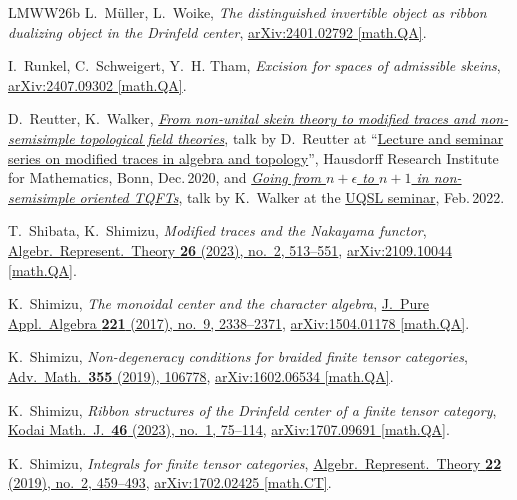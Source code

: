 \documentclass[11pt]{amsart}
\theoremstyle{definition}
\numberwithin{equation}{section}
\newcommand\arxiv[2]      {\href{http://arXiv.org/abs/#1}{arXiv:#2}}
\newcommand\doi[2]        {\href{http://dx.doi.org/#1}{#2}}
\begin{document}
\begin{thebibliography}{LMWW26b}
L.~M\"uller, L.~Woike,
\textsl{The distinguished invertible object as ribbon dualizing object in the Drinfeld center},
\arxiv{2401.02792}{2401.02792 [math.QA]}.

I.~Runkel, C.~Schweigert, Y.~H. Tham,
\textsl{Excision for spaces of admissible skeins},
\arxiv{2407.09302}{2407.09302 [math.QA]}.

D.~Reutter, K.~Walker, \href{https://www.davidreutter.com/#h.p_e6SqJNffk9Sy}{\emph{From non-unital skein theory to modified traces and non-semisimple topological field theories}}, talk by D.~Reutter at ``\href{https://him-application.uni-bonn.de/en/programs/past-programs/past-junior-trimester-programs/new-trends-in-representation-theory/lecture-and-seminar-series-on-modified-traces-in-algebra-and-topology}{Lecture and seminar series on modified traces in algebra and topology}'', Hausdorff Research Institute for Mathematics, Bonn, Dec.\,2020, and \href{https://canyoN_23.net/math/talks}{\emph{Going from $n+\epsilon$ to $n+1$ in non-semisimple oriented TQFTs}}, talk by K.~Walker at the \href{https://www.coreyjonesmath.com/uqsl-fall2020}{UQSL seminar}, Feb.\,2022.

T.~Shibata, K.~Shimizu,
\textsl{Modified traces and the Nakayama functor},
\doi{10.1007/s10468-021-10102-5}{Algebr.\ Represent.\ Theory \textbf{26} (2023), no.~2, 513--551},
\arxiv{2109.10044}{2109.10044 [math.QA]}.

K.~Shimizu,
\textsl{The monoidal center and the character algebra},
\doi{10.1016/j.jpaa.2016.12.037}{J.\ Pure Appl.\ Algebra \textbf{221} (2017), no.~9, 2338--2371},
\arxiv{1504.01178}{1504.01178 [math.QA]}.

K.~Shimizu,
\textsl{Non-degeneracy conditions for braided finite tensor categories},
\doi{10.1016/j.aim.2019.106778}{Adv.\ Math.\ \textbf{355} (2019), 106778},
\arxiv{1602.06534}{1602.06534 [math.QA]}.

K.~Shimizu,
\textsl{Ribbon structures of the Drinfeld center of a finite tensor category},
\doi{10.2996/kmj46106}{Kodai Math.\ J.\ \textbf{46} (2023), no.~1, 75--114},
\arxiv{1707.09691}{1707.09691 [math.QA]}.

K.~Shimizu,
\textsl{Integrals for finite tensor categories},
\doi{10.1007/s10468-018-9777-5}{Algebr.\ Represent.\ Theory \textbf{22} (2019), no.~2, 459--493},
\arxiv{1702.02425}{1702.02425 [math.CT]}.


\end{thebibliography}
\end{document}
